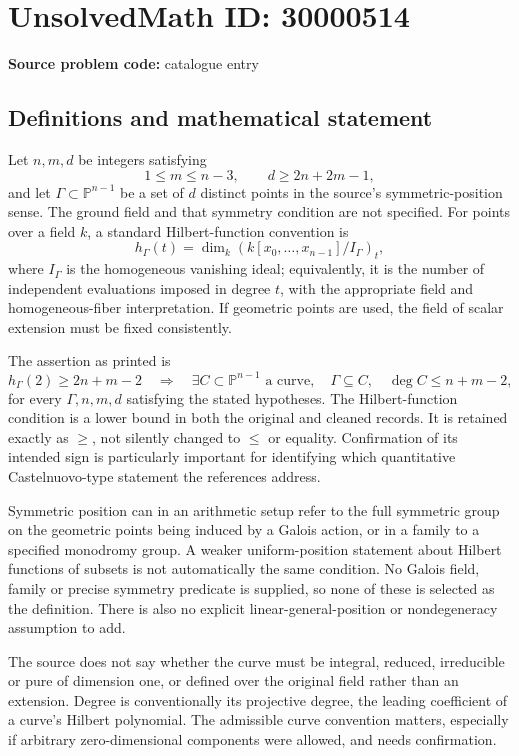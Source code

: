 \documentclass[11pt]{article}
\begin{document}
\section*{UnsolvedMath ID: 30000514}
\textbf{Source problem code:} catalogue entry
\subsection{Definitions and mathematical statement}
Let \(n,m,d\) be integers satisfying
\[
 1\leq m\leq n-3,\qquad d\geq2n+2m-1,
\]
and let \(\Gamma\subset\mathbb P^{n-1}\) be a set of \(d\) distinct points in the source's symmetric-position sense. The ground field and that symmetry condition are not specified. For points over a field \(k\), a standard Hilbert-function convention is
\[
 h_\Gamma(t)=\dim_k(k[x_0,\ldots,x_{n-1}]/I_\Gamma)_t,
\]
where \(I_\Gamma\) is the homogeneous vanishing ideal; equivalently, it is the number of independent evaluations imposed in degree \(t\), with the appropriate field and homogeneous-fiber interpretation. If geometric points are used, the field of scalar extension must be fixed consistently.

The assertion as printed is
\[
 h_\Gamma(2)\geq2n+m-2
 \quad\Longrightarrow\quad
 \exists C\subset\mathbb P^{n-1}\text{ a curve},\quad
 \Gamma\subseteq C,\quad\deg C\leq n+m-2,
\]
for every \(\Gamma,n,m,d\) satisfying the stated hypotheses. The Hilbert-function condition is a lower bound in both the original and cleaned records. It is retained exactly as \(\geq\), not silently changed to \(\leq\) or equality. Confirmation of its intended sign is particularly important for identifying which quantitative Castelnuovo-type statement the references address.

Symmetric position can in an arithmetic setup refer to the full symmetric group on the geometric points being induced by a Galois action, or in a family to a specified monodromy group. A weaker uniform-position statement about Hilbert functions of subsets is not automatically the same condition. No Galois field, family or precise symmetry predicate is supplied, so none of these is selected as the definition. There is also no explicit linear-general-position or nondegeneracy assumption to add.

The source does not say whether the curve must be integral, reduced, irreducible or pure of dimension one, or defined over the original field rather than an extension. Degree is conventionally its projective degree, the leading coefficient of a curve's Hilbert polynomial. The admissible curve convention matters, especially if arbitrary zero-dimensional components were allowed, and needs confirmation.
\end{document}
